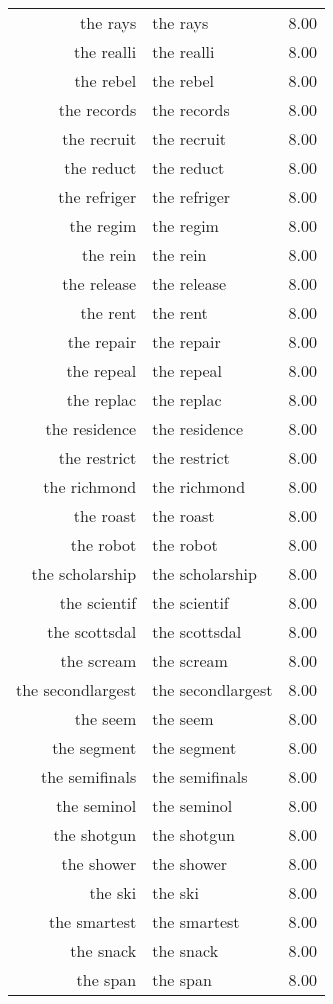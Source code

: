 \begin{table}[ht]
\begin{tabular}{rlr}
  the rays & the rays & 8.00 \\ 
  the realli & the realli & 8.00 \\ 
  the rebel & the rebel & 8.00 \\ 
  the records & the records & 8.00 \\ 
  the recruit & the recruit & 8.00 \\ 
  the reduct & the reduct & 8.00 \\ 
  the refriger & the refriger & 8.00 \\ 
  the regim & the regim & 8.00 \\ 
  the rein & the rein & 8.00 \\ 
  the release & the release & 8.00 \\ 
  the rent & the rent & 8.00 \\ 
  the repair & the repair & 8.00 \\ 
  the repeal & the repeal & 8.00 \\ 
  the replac & the replac & 8.00 \\ 
  the residence & the residence & 8.00 \\ 
  the restrict & the restrict & 8.00 \\ 
  the richmond & the richmond & 8.00 \\ 
  the roast & the roast & 8.00 \\ 
  the robot & the robot & 8.00 \\ 
  the scholarship & the scholarship & 8.00 \\ 
  the scientif & the scientif & 8.00 \\ 
  the scottsdal & the scottsdal & 8.00 \\ 
  the scream & the scream & 8.00 \\ 
  the secondlargest & the secondlargest & 8.00 \\ 
  the seem & the seem & 8.00 \\ 
  the segment & the segment & 8.00 \\ 
  the semifinals & the semifinals & 8.00 \\ 
  the seminol & the seminol & 8.00 \\ 
  the shotgun & the shotgun & 8.00 \\ 
  the shower & the shower & 8.00 \\ 
  the ski & the ski & 8.00 \\ 
  the smartest & the smartest & 8.00 \\ 
  the snack & the snack & 8.00 \\ 
  the span & the span & 8.00 \\ 

\end{tabular}
\end{table}
